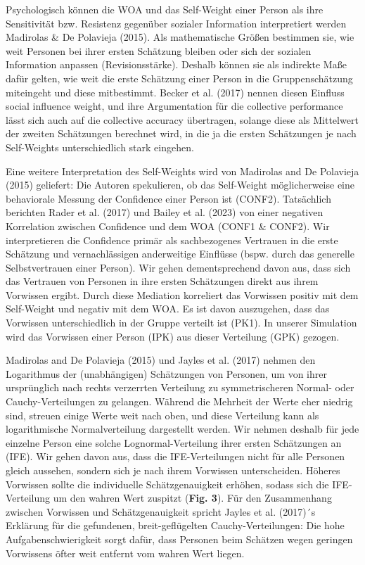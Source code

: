 \documentclass[
  man,floatsintext]{apa6}
\begin{document}
Psychologisch können die WOA und das Self-Weight einer Person als ihre Sensitivität bzw. Resistenz gegenüber sozialer Information interpretiert werden Madirolas \& De Polavieja (2015). Als mathematische Größen bestimmen sie, wie weit Personen bei ihrer ersten Schätzung bleiben oder sich der sozialen Information anpassen (Revisionsstärke). Deshalb können sie als indirekte Maße dafür gelten, wie weit die erste Schätzung einer Person in die Gruppenschätzung miteingeht und diese mitbestimmt. Becker et al. (2017) nennen diesen Einfluss social influence weight, und ihre Argumentation für die collective performance lässt sich auch auf die collective accuracy übertragen, solange diese als Mittelwert der zweiten Schätzungen berechnet wird, in die ja die ersten Schätzungen je nach Self-Weights unterschiedlich stark eingehen.

Eine weitere Interpretation des Self-Weights wird von Madirolas and De Polavieja (2015) geliefert: Die Autoren spekulieren, ob das Self-Weight möglicherweise eine behaviorale Messung der Confidence einer Person ist (CONF2). Tatsächlich berichten Rader et al. (2017) und Bailey et al. (2023) von einer negativen Korrelation zwischen Confidence und dem WOA (CONF1 \& CONF2). Wir interpretieren die Confidence primär als sachbezogenes Vertrauen in die erste Schätzung und vernachlässigen anderweitige Einflüsse (bspw. durch das generelle Selbstvertrauen einer Person). Wir gehen dementsprechend davon aus, dass sich das Vertrauen von Personen in ihre ersten Schätzungen direkt aus ihrem Vorwissen ergibt. Durch diese Mediation korreliert das Vorwissen positiv mit dem Self-Weight und negativ mit dem WOA. Es ist davon auszugehen, dass das Vorwissen unterschiedlich in der Gruppe verteilt ist (PK1). In unserer Simulation wird das Vorwissen einer Person (IPK) aus dieser Verteilung (GPK) gezogen.

Madirolas and De Polavieja (2015) und Jayles et al. (2017) nehmen den Logarithmus der (unabhängigen) Schätzungen von Personen, um von ihrer ursprünglich nach rechts verzerrten Verteilung zu symmetrischeren Normal- oder Cauchy-Verteilungen zu gelangen. Während die Mehrheit der Werte eher niedrig sind, streuen einige Werte weit nach oben, und diese Verteilung kann als logarithmische Normalverteilung dargestellt werden. Wir nehmen deshalb für jede einzelne Person eine solche Lognormal-Verteilung ihrer ersten Schätzungen an (IFE). Wir gehen davon aus, dass die IFE-Verteilungen nicht für alle Personen gleich aussehen, sondern sich je nach ihrem Vorwissen unterscheiden. Höheres Vorwissen sollte die individuelle Schätzgenauigkeit erhöhen, sodass sich die IFE-Verteilung um den wahren Wert zuspitzt (\textbf{Fig. 3}). Für den Zusammenhang zwischen Vorwissen und Schätzgenauigkeit spricht Jayles et al. (2017)´s Erklärung für die gefundenen, breit-geflügelten Cauchy-Verteilungen: Die hohe Aufgabenschwierigkeit sorgt dafür, dass Personen beim Schätzen wegen geringen Vorwissens öfter weit entfernt vom wahren Wert liegen.
\end{document}

